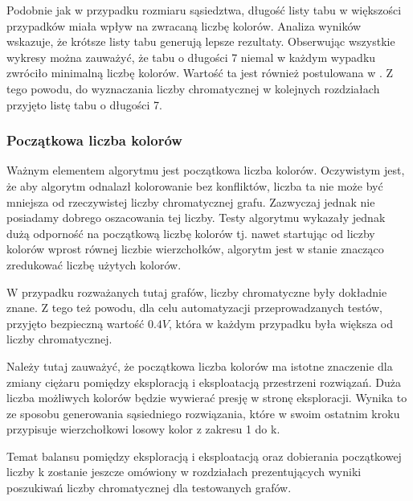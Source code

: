 \documentclass[12pt,a4paper]{article}
\begin{document}
Podobnie jak w przypadku rozmiaru sąsiedztwa, długość listy tabu w większości przypadków miała wpływ na zwracaną liczbę kolorów. Analiza wyników wskazuje, że krótsze listy tabu generują lepsze rezultaty. Obserwując wszystkie wykresy można zauważyć, że tabu o długości 7 niemal w każdym wypadku zwróciło minimalną liczbę kolorów. Wartość ta jest również postulowana w \cite{Hertz1987}. Z tego powodu, do wyznaczania liczby chromatycznej w kolejnych rozdziałach przyjęto listę tabu o długości 7.
\subsubsection{Początkowa liczba kolorów}
Ważnym elementem algorytmu jest początkowa liczba kolorów. Oczywistym jest, że aby algorytm odnalazł kolorowanie bez konfliktów, liczba ta nie może być mniejsza od rzeczywistej liczby chromatycznej grafu. Zazwyczaj jednak nie posiadamy dobrego oszacowania tej liczby. Testy algorytmu wykazały jednak dużą odporność na początkową liczbę kolorów tj. nawet startując od liczby kolorów wprost równej liczbie wierzchołków, algorytm jest w stanie znacząco zredukować liczbę użytych kolorów.

W przypadku rozważanych tutaj grafów, liczby chromatyczne były dokładnie znane. Z tego też powodu, dla celu automatyzacji przeprowadzanych testów, przyjęto bezpieczną wartość $0.4 V$, która w każdym przypadku była większa od liczby chromatycznej.

Należy tutaj zauważyć, że początkowa liczba kolorów ma istotne znaczenie dla zmiany ciężaru pomiędzy eksploracją i eksploatacją przestrzeni rozwiązań. Duża liczba możliwych kolorów będzie wywierać presję w stronę eksploracji. Wynika to ze sposobu generowania sąsiedniego rozwiązania, które w swoim ostatnim kroku przypisuje wierzchołkowi losowy kolor z zakresu 1 do k.

Temat balansu pomiędzy eksploracją i eksploatacją oraz dobierania początkowej liczby k zostanie jeszcze omówiony w rozdziałach prezentujących wyniki poszukiwań liczby chromatycznej dla testowanych grafów.
\end{document}
